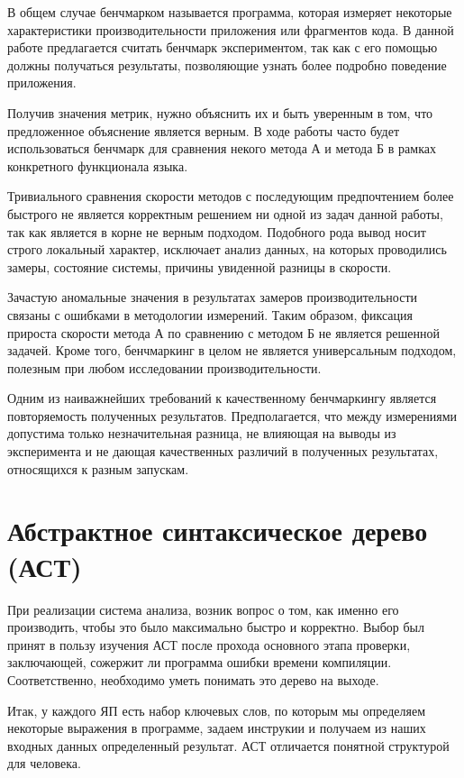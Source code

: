 \documentclass{mipt-thesis-bs}
\begin{document}
В общем случае бенчмарком называется программа, которая измеряет некоторые характеристики
производительности приложения или фрагментов кода. В данной работе предлагается считать
бенчмарк экспериментом, так как с его помощью должны получаться результаты, позволяющие
узнать более подробно поведение приложения.

Получив значения метрик, нужно объяснить их и быть уверенным в том, что предложенное
объяснение является верным. В ходе работы часто будет использоваться бенчмарк для
сравнения некого метода А и метода Б в рамках конкретного функционала языка.

Тривиального сравнения скорости методов с последующим предпочтением более быстрого не является
корректным решением ни одной из задач данной работы, так как является в корне не верным подходом.
Подобного рода вывод носит строго локальный характер, исключает анализ данных, на которых
проводились замеры, состояние системы, причины увиденной разницы в скорости.

Зачастую аномальные значения в результатах замеров производительности связаны с
ошибками в методологии измерений. Таким образом, фиксация прироста скорости метода А по сравнению
с методом Б не является решенной задачей. Кроме того, бенчмаркинг в целом не является
универсальным подходом, полезным при любом исследовании производительности.

Одним из наиважнейших требований к качественному бенчмаркингу является повторяемость
полученных результатов. Предполагается, что между измерениями допустима только незначительная
разница, не влияющая на выводы из эксперимента и не дающая качественных различий в полученных
результатах, относящихся к разным запускам.

\section{Абстрактное синтаксическое дерево (АСТ)}

При реализации система анализа, возник вопрос о том, как именно его производить, чтобы это
было максимально быстро и корректно. Выбор был принят в пользу изучения АСТ после прохода основного
этапа проверки, заключающей, сожержит ли программа ошибки времени компиляции. Соответственно, необходимо
уметь понимать это дерево на выходе.

Итак, у каждого ЯП есть набор ключевых слов, по которым мы определяем некоторые выражения в программе,
задаем инструкии и получаем из наших входных данных определенный результат. АСТ отличается понятной
структурой для человека.
\end{document}

